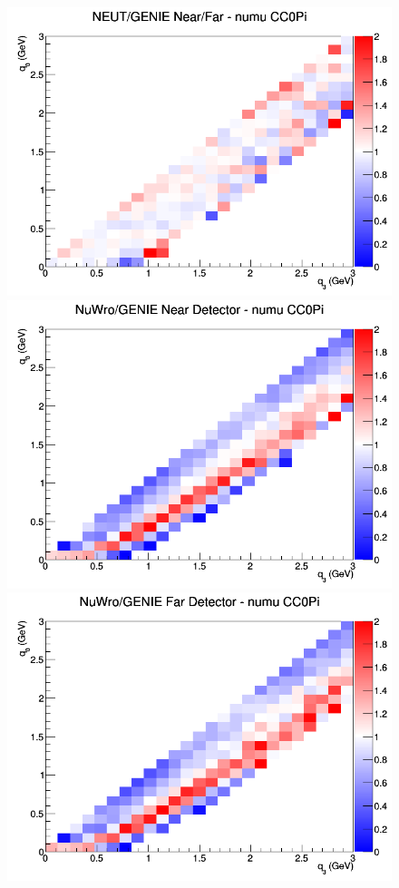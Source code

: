 \begin{figure}[h]
\endminipage
{}
\includegraphics[width=\linewidth]{q0_q3/nominal/ratios/CC0Pi_NEUT_GENIE_numu_NF_q3_q0.png}
\endminipage
\newline
{}
\includegraphics[width=\linewidth]{q0_q3/nominal/ratios/CC0Pi_NuWro_GENIE_numu_near_q3_q0.png}
\endminipage
{}
\includegraphics[width=\linewidth]{q0_q3/nominal/ratios/CC0Pi_NuWro_GENIE_numu_far_q3_q0.png}

\end{figure}
